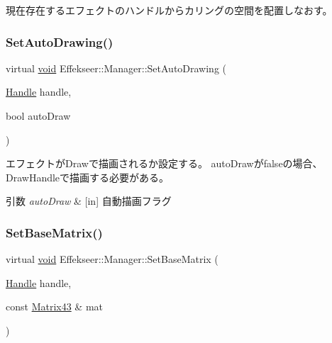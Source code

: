 現在存在するエフェクトのハンドルからカリングの空間を配置しなおす。 

\mbox{\label{class_effekseer_1_1_manager_a3829cb7c98f3c41d79394eead1eaaa04}} 
\subsubsection{\texorpdfstring{Set\+Auto\+Drawing()}{SetAutoDrawing()}}
{\footnotesize\ttfamily virtual \mbox{\hyperlink{namespace_effekseer_ab34c4088e512200cf4c2716f168deb56}{void}} Effekseer\+::\+Manager\+::\+Set\+Auto\+Drawing (\begin{DoxyParamCaption}\item[{\mbox{\hyperlink{namespace_effekseer_afba58b8d812da862190e9bbfc040824a}{Handle}}}]{handle,  }\item[{bool}]{auto\+Draw }\end{DoxyParamCaption})\hspace{0.3cm}{\ttfamily [pure virtual]}}



エフェクトが\+Drawで描画されるか設定する。 auto\+Drawがfalseの場合、\+Draw\+Handleで描画する必要がある。 


\begin{DoxyParams}{引数}
{\em auto\+Draw} & \mbox{[}in\mbox{]} 自動描画フラグ \\
\hline
\end{DoxyParams}
\mbox{\label{class_effekseer_1_1_manager_a0f94ad0b6cd362283bc216515a89822c}} 
\subsubsection{\texorpdfstring{Set\+Base\+Matrix()}{SetBaseMatrix()}}
{\footnotesize\ttfamily virtual \mbox{\hyperlink{namespace_effekseer_ab34c4088e512200cf4c2716f168deb56}{void}} Effekseer\+::\+Manager\+::\+Set\+Base\+Matrix (\begin{DoxyParamCaption}\item[{\mbox{\hyperlink{namespace_effekseer_afba58b8d812da862190e9bbfc040824a}{Handle}}}]{handle,  }\item[{const \mbox{\hyperlink{struct_effekseer_1_1_matrix43}{Matrix43}} \&}]{mat }\end{DoxyParamCaption})\hspace{0.3cm}{\ttfamily [pure virtual]}}



